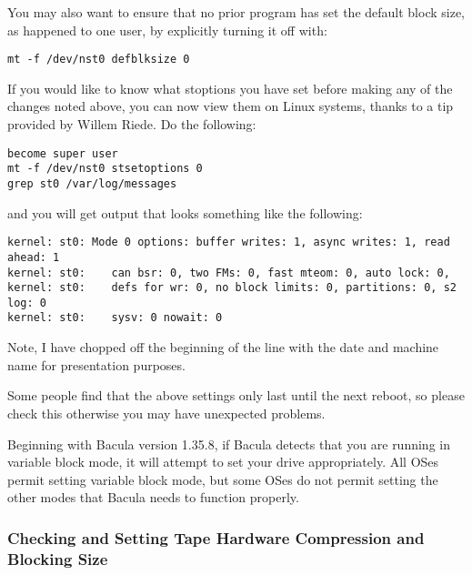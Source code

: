 You may also want to ensure that no prior program has set the default block
size, as happened to one user, by explicitly turning it off with: 

\footnotesize
\begin{verbatim}
mt -f /dev/nst0 defblksize 0
\end{verbatim}
\normalsize

If you would like to know what stoptions you have set before making any of the
changes noted above, you can now view them on Linux systems, thanks to a tip
provided by Willem Riede. Do the following: 

\footnotesize
\begin{verbatim}
become super user
mt -f /dev/nst0 stsetoptions 0
grep st0 /var/log/messages
\end{verbatim}
\normalsize

and you will get output that looks something like the following: 

\footnotesize
\begin{verbatim}
kernel: st0: Mode 0 options: buffer writes: 1, async writes: 1, read ahead: 1
kernel: st0:    can bsr: 0, two FMs: 0, fast mteom: 0, auto lock: 0,
kernel: st0:    defs for wr: 0, no block limits: 0, partitions: 0, s2 log: 0
kernel: st0:    sysv: 0 nowait: 0
\end{verbatim}
\normalsize

Note, I have chopped off the beginning of the line with the date and machine
name for presentation purposes. 

Some people find that the above settings only last until the next reboot, so
please check this otherwise you may have unexpected problems. 

Beginning with Bacula version 1.35.8, if Bacula detects that you are running
in variable block mode, it will attempt to set your drive appropriately. All
OSes permit setting variable block mode, but some OSes do not permit setting
the other modes that Bacula needs to function properly. 
\label{compression}

\subsubsection*{Checking and Setting Tape Hardware Compression and Blocking
Size}


